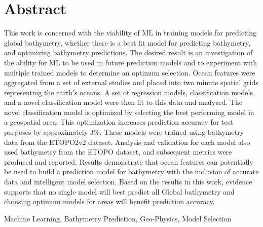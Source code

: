 \setcounter{secnumdepth}{0}
\section{Abstract}
\setlength{\parindent}{10ex}
This work is concerned with the viability of \ac{ML} in training models for predicting global bathymetry, whether there is a best fit model for predicting bathymetry, and optimizing bathymetry predictions. 
The desired result is an investigation of the ability for ML to be used in future prediction models and to experiment with multiple trained models 
to determine an optimum selection. Ocean features were aggregated from a set of external studies and placed into two minute spatial grids representing 
the earth's oceans. A set of regression models, classification models, and a novel classification model were then fit to this data and analyzed. 
The novel classification model is optimized by selecting the best performing model in a geospatial area. This optimization increases prediction accuracy
for test purposes by approximately 3\%. 
These models were trained using bathymetry data from the ETOPO2v2 dataset. Analysis and validation for each model also used bathymetry from the 
ETOPO dataset, and subsequent metrics were produced and reported. Results demonstrate that ocean features can potentially be used to build a 
prediction model for bathymetry with the inclusion of accurate data and intelligent model selection. Based on the results in this work, evidence 
supports that no single model will best predict all Global bathymetry and choosing optimum models for areas will benefit prediction accuracy.

\vfill
\noindent
Machine Learning, Bathymetry Prediction, Geo-Physics, Model Selection